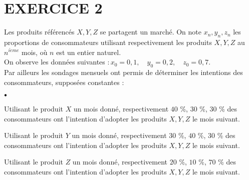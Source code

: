 \documentclass[11pt]{article}%
\begin{document}
\section*{EXERCICE 2}

Les produits référencés $X,Y,Z$ se partagent un marché. On note
$x_{n},y_{n},z_{n}$ les proportions de consommateurs utilisant
respectivement
les produits $X,Y,Z$ au $n^{i\grave{e}me}$ mois, où $n$ est un entier
naturel.\\
On observe les données suivantes $ :x_{0} = 0,1,\quad y_{0} = 0,2,\quad
z_{0} = 0,7.
$\\
Par ailleurs les sondages mensuels ont permis de déterminer les
intentions
des consommateurs, supposées constantes :

\begin{noliste}{$\scriptstyle \bullet$}
\item Utilisant le produit $X$ un mois donné, respectivement $40$ \%,
$30$
\%, $30$ \% des consommateurs ont l'intention d'adopter les produits
$X,Y,Z$
le mois suivant.

\item Utilisant le produit $Y$ un mois donné, respectivement $30$ \%,
$40$
\%, $30$ \% des consommateurs ont l'intention d'adopter les produits
$X,Y,Z$
le mois suivant.

\item Utilisant le produit $Z$ un mois donné, respectivement $20$ \%,
$10$
\%, $70$ \% des consommateurs ont l'intention d'adopter les produits
$X,Y,Z$
le mois suivant.
\end{noliste}
\end{document}
